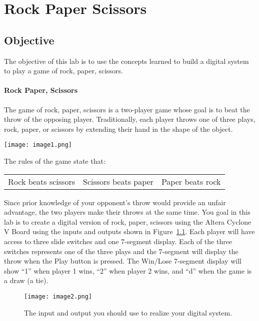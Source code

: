\chapter{Rock Paper Scissors}
\label{RPS}
\graphicspath{ {./Lab03RockPaperScissor/Fig} }


\hypertarget{objective}{%
\section{Objective }
\label{section:rpsObjective}}

The objective of this lab is to use the concepts learned to build a
digital system to play a game of rock, paper, scissors.

\subsubsection{Rock Paper, Scissors}

The game of rock, paper, scissors is a two-player game whose goal is to
beat the throw of the opposing player. Traditionally, each player throws
one of three plays, rock, paper, or scissors by extending their hand in
the shape of the object.

\texttt{[image:  image1.png]}

The rules of the game state that:

\begin{tabular}{p{4cm}p{4cm}p{4cm}}
Rock beats scissors  & Scissors beats paper & Paper beats rock \\
\end{tabular}

Since prior knowledge of your opponent's throw would provide an unfair
advantage, the two players make their throws at the same time. You goal 
in this lab is to create a digital version of rock, paper,
scissors using the Altera Cyclone V Board using the inputs and outputs
shown in Figure~\ref{figure:systemIO}. Each player will have access to three slide switches
and one 7-segment display. Each of the three switches represents one of
the three plays and the 7-segment will display the throw when the Play
button is pressed. The Win/Lose 7-segment display will show ``1'' when
player 1 wins, ``2'' when player 2 wins, and ``d'' when the game is a
draw (a tie).

\begin{figure}[ht]
\texttt{[image:  image2.png]}
\caption{The input and output you should use to realize your digital system.}
\label{figure:systemIO}
\end{figure}



